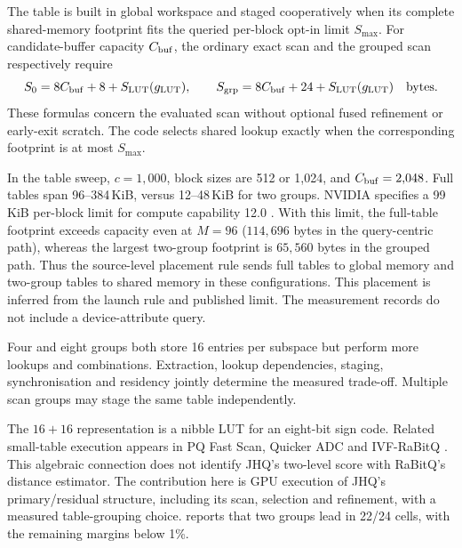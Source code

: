 The table is built in global workspace and staged cooperatively when
its complete shared-memory footprint fits the queried per-block opt-in
limit $S_{\max}$. For candidate-buffer capacity $C_{\rm buf}$, the
ordinary exact scan and the grouped scan respectively require
\begin{equation}
 S_0=8C_{\rm buf}+8+S_{\rm LUT}(g_{\mathrm{LUT}}),\qquad
 S_{\rm grp}=8C_{\rm buf}+24+S_{\rm LUT}(g_{\mathrm{LUT}})
 \quad\text{bytes}.
 \label{eq:5-shared-footprint}
\end{equation}
These formulas concern the evaluated scan without optional fused
refinement or early-exit scratch. The code selects shared lookup exactly
when the corresponding footprint is at most $S_{\max}$.

In the table sweep, $c=1{,}000$, block sizes are 512 or 1,024, and
$C_{\rm buf}=2{,}048$. Full tables span 96--384\,KiB, versus
12--48\,KiB for two groups. NVIDIA specifies a 99\,KiB per-block limit
for compute capability 12.0 \cite{blackwell_tuning}. With this limit,
the full-table footprint exceeds capacity even at $M=96$
($114{,}696$ bytes in the query-centric path), whereas the largest
two-group footprint is $65{,}560$ bytes in the grouped path.
Thus the source-level placement rule sends full tables to global memory
and two-group tables to shared memory in these configurations. This placement is inferred from the launch rule and published limit.
The measurement records do not include a device-attribute query.

Four and eight groups both store 16 entries per subspace but perform
more lookups and combinations. Extraction, lookup dependencies, staging,
synchronisation and residency jointly determine the measured trade-off.
Multiple scan groups may stage the same table independently.

The $16+16$ representation is a nibble LUT for an eight-bit sign code.
Related small-table execution appears in PQ Fast Scan, Quicker ADC and
IVF-RaBitQ \cite{fastscan,quickeradc,ivfrabitq}. This algebraic connection
does not identify JHQ's two-level score with RaBitQ's distance estimator.
The contribution here is GPU execution of JHQ's primary/residual
structure, including its scan, selection and refinement, with a measured
table-grouping choice.  reports that two groups lead in
22/24 cells, with the remaining margins below 1\%.
